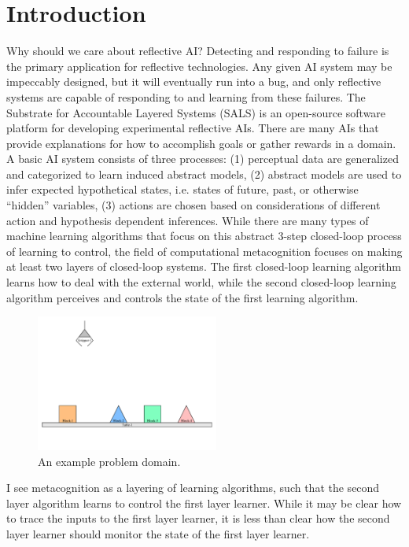 \chapter{Introduction}
\label{chapter:introduction}

Why should we care about reflective AI?  Detecting and responding to
failure is the primary application for reflective technologies.  Any
given AI system may be impeccably designed, but it will eventually run
into a bug, and only reflective systems are capable of responding to
and learning from these failures.  The Substrate for Accountable
Layered Systems (SALS) is an open-source software platform for
developing experimental reflective AIs.  There are many AIs that
provide explanations for how to accomplish goals or gather rewards in
a domain.  A basic AI system consists of three processes: (1)
perceptual data are generalized and categorized to learn induced
abstract models, (2) abstract models are used to infer expected
hypothetical states, i.e. states of future, past, or otherwise
``hidden'' variables, (3) actions are chosen based on considerations
of different action and hypothesis dependent inferences.  While there
are many types of machine learning algorithms that focus on this
abstract 3-step closed-loop process of learning to control, the field
of computational metacognition \cite[]{cox_and_raja:2008,cox:2010}
focuses on making at least two layers of closed-loop systems.  The
first closed-loop learning algorithm learns how to deal with the
external world, while the second closed-loop learning algorithm
perceives and controls the state of the first learning algorithm.
\begin{figure}
  \includegraphics[width=6cm]{gfx/blocks_world_large-01}
  \caption[An example problem domain.]{An example problem domain.}
  \label{figure:introduction_example_problem_domain}
\end{figure}
I see metacognition as a layering of learning algorithms, such that
the second layer algorithm learns to control the first layer learner.
While it may be clear how to trace the inputs to the first layer
learner, it is less than clear how the second layer learner should
monitor the state of the first layer learner.

